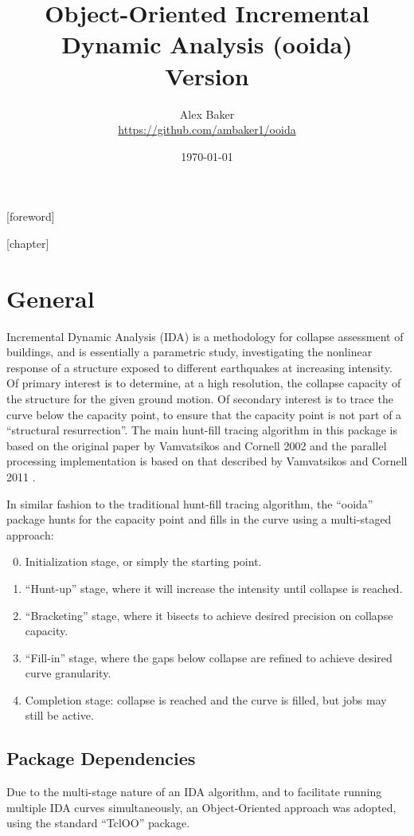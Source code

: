 \documentclass{article}
\title{\LARGE Object-Oriented Incremental Dynamic Analysis (ooida)\\\small Version \version}
\author{Alex Baker\\\small\url{https://github.com/ambaker1/ooida}}
\date{\small\today}
\renewcommand{\^}[1]{\textsuperscript{#1}}
\renewcommand{\_}[1]{\textsubscript{#1}}
\begin{document}
\maketitle
\thispagestyle{empty}
\clearpage
{}[foreword]{}
\pagestyle{plain}
\clearpage
{}
\tableofcontents
\markboth{}{}
\clearpage
{}[chapter]{}
\pagestyle{main}
\section{General}
Incremental Dynamic Analysis (IDA) is a methodology for collapse assessment of buildings, and is essentially a parametric study, investigating the nonlinear response of a structure exposed to different earthquakes at increasing intensity. 
Of primary interest is to determine, at a high resolution, the collapse capacity of the structure for the given ground motion.
Of secondary interest is to trace the curve below the capacity point, to ensure that the capacity point is not part of a ``structural resurrection''.
The main hunt-fill tracing algorithm in this package is based on the original paper by Vamvatsikos and Cornell 2002 \cite{vamvatsikos_incremental_2002} and the parallel processing implementation is based on that described by Vamvatsikos and Cornell 2011 \cite{vamvatsikos_performing_2011}.

In similar fashion to the traditional hunt-fill tracing algorithm, the ``ooida'' package hunts for the capacity point and fills in the curve using a multi-staged approach:
\begin{enumerate}[label=\quad Stage \arabic*:,itemindent=*]
  \setcounter{enumi}{-1}
  \item Initialization stage, or simply the starting point. 
  \item ``Hunt-up'' stage, where it will increase the intensity until collapse is reached. 
  \item ``Bracketing'' stage, where it bisects to achieve desired precision on collapse capacity. 
  \item ``Fill-in'' stage, where the gaps below collapse are refined to achieve desired curve granularity. 
  \item Completion stage: collapse is reached and the curve is filled, but jobs may still be active.
\end{enumerate}

\subsection{Package Dependencies}
Due to the multi-stage nature of an IDA algorithm, and to facilitate running multiple IDA curves simultaneously, an Object-Oriented approach was adopted, using the standard ``TclOO'' package. 
\end{document}
